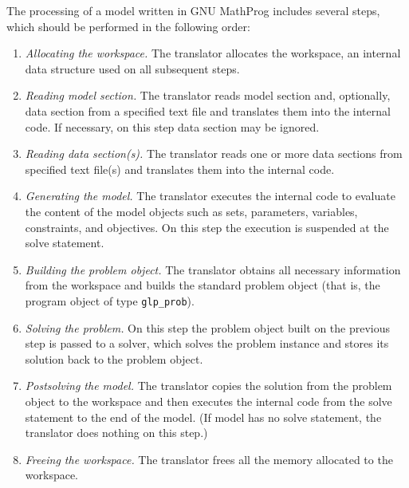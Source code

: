 The processing of a model written in GNU MathProg includes several
steps, which should be performed in the following order:

\vspace*{-8pt}

\begin{enumerate}
\item{\it Allocating the workspace.}
The translator allocates the workspace, an internal data structure used
on all subsequent steps.

\item{\it Reading model section.} The translator reads model section
and, optionally, data section from a specified text file and translates
them into the internal code. If necessary, on this step data section
may be ignored.

\item{\it Reading data section(s).} The translator reads one or more
data sections from specified text file(s) and translates them into the
internal code.

\item{\it Generating the model.} The translator executes the internal
code to evaluate the content of the model objects such as sets,
parameters, variables, constraints, and objectives. On this step the
execution is suspended at the solve statement.

\item {\it Building the problem object.} The translator obtains all
necessary information from the workspace and builds the standard
problem object (that is, the program object of type \verb|glp_prob|).

\item{\it Solving the problem.} On this step the problem object built
on the previous step is passed to a solver, which solves the problem
instance and stores its solution back to the problem object.

\item{\it Postsolving the model.} The translator copies the solution
from the problem object to the workspace and then executes the internal
code from the solve statement to the end of the model. (If model has
no solve statement, the translator does nothing on this step.)

\item{\it Freeing the workspace.} The translator frees all the memory
allocated to the workspace.
\end{enumerate}

\vspace*{-8pt}

